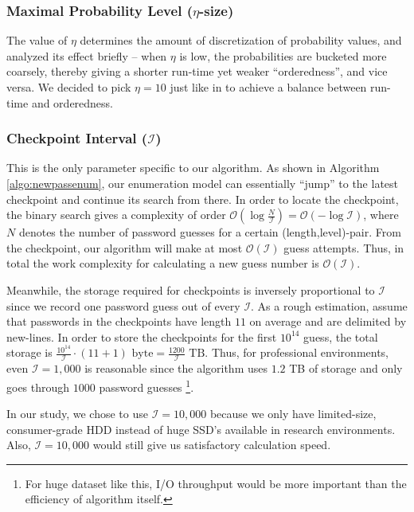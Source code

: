 \documentclass{article} %
\theoremstyle{definition}
\theoremstyle{theorem}
\theoremstyle{remark}
\theoremstyle{remark}
\begin{document}
\subsubsection{Maximal Probability Level ($\eta$-size)}
\par\quad The value of $\eta$ determines the amount of discretization of probability values, and \cite{omen} analyzed its effect briefly -- when $\eta$ is low, the probabilities are bucketed more coarsely, thereby giving a shorter run-time yet weaker ``orderedness'', and vice versa. We decided to pick $\eta=10$ just like in \cite{omen} to achieve a balance between run-time and orderedness.

\subsubsection{Checkpoint Interval ($\mathcal{I}$)}
\par\quad This is the only parameter specific to our algorithm. As shown in Algorithm \ref{algo:newpassenum}, our enumeration model can essentially ``jump'' to the latest checkpoint and continue its search from there. In order to locate the checkpoint, the binary search gives a complexity of order $\mathcal{O}(\log \frac{N}{\mathcal{I}}) = \mathcal{O}(-\log\mathcal{I})$, where $N$ denotes the number of password guesses for a certain (length,level)-pair. From the checkpoint, our algorithm will make at most $\mathcal{O}(\mathcal{I})$ guess attempts. Thus, in total the work complexity for calculating a new guess number is $\mathcal{O}(\mathcal{I})$.

\par\quad Meanwhile, the storage required for checkpoints is inversely proportional to $\mathcal{I}$ since we record one password guess out of every $\mathcal{I}$. As a rough estimation, assume that passwords in the checkpoints have length $11$ on average and are delimited by new-lines. In order to store the checkpoints for the first $10^{14}$ guess, the total storage is $\frac{10^{14}}{\mathcal{I}} \cdot (11 + 1) \text{ byte} = \frac{1200}{\mathcal{I}} \text{ TB}$. Thus, for professional environments, even $\mathcal{I}=1,000$ is reasonable since the algorithm uses $1.2$ TB of storage and only goes through $1000$ password guesses \footnote{For huge dataset like this, I/O throughput would be more important than the efficiency of algorithm itself.}.

\par\quad In our study, we chose to use $\mathcal{I}=10,000$ because we only have limited-size, consumer-grade HDD instead of huge SSD's available in research environments. Also, $\mathcal{I}=10,000$ would still give us satisfactory calculation speed.
\end{document}
